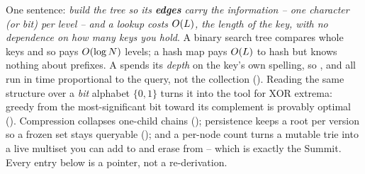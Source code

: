 

One sentence: \emph{build the tree so its \textbf{edges} carry the information -- one character (or bit)
per level -- and a lookup costs $O(L)$, the length of the key, with no dependence on how many keys you
hold}. A binary search tree compares whole keys and so pays $O(\log N)$ levels; a hash map pays
$O(L)$ to hash but knows nothing about prefixes. A  spends its \emph{depth} on the key's own
spelling, so ,  and  all run in time proportional to the query,
not the collection (). Reading the same structure over a \emph{bit} alphabet
$\{0,1\}$ turns it into the tool for XOR extrema: greedy from the most-significant bit toward its
complement is provably optimal (). Compression collapses one-child chains
(); persistence keeps a root per version so a frozen set stays queryable
(); and a per-node count turns a mutable trie into a live multiset you can add to and
erase from -- which is exactly the Summit. Every entry below is a pointer, not a re-derivation.

